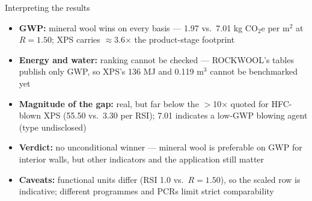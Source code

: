 \documentclass[11pt,aspectratio=43,ignorenonframetext,t]{beamer}
\begin{document}
\begin{frame}{Interpreting the results}
  \begin{itemize}
    \item \textbf{GWP:} mineral wool wins on every basis --- 1.97 vs.\ 7.01 kg CO$_2$e per m$^2$ at $R=1.50$; XPS carries $\approx$3.6$\times$ the product-stage footprint
    \item \textbf{Energy and water:} ranking cannot be checked --- ROCKWOOL's tables publish only GWP, so XPS's 136 MJ and 0.119 m$^3$ cannot be benchmarked yet
    \item \textbf{Magnitude of the gap:} real, but far below the $>$10$\times$ quoted for HFC-blown XPS (55.50 vs.\ 3.30 per RSI); 7.01 indicates a low-GWP blowing agent (type undisclosed)
    \item \textbf{Verdict:} no unconditional winner --- mineral wool is preferable on GWP for interior walls, but other indicators and the application still matter
    \item \textbf{Caveats:} functional units differ (RSI 1.0 vs.\ $R=1.50$), so the scaled row is indicative; different programmes and PCRs limit strict comparability
  \end{itemize}

\end{frame}
\end{document}
